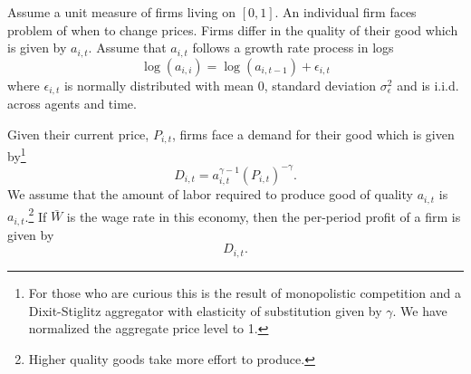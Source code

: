 \documentclass{exam}
\begin{document}
Assume a unit measure of firms living on $[0,1]$.  An individual firm faces problem of when to change prices.  Firms differ in the quality of their good which is given by $a_{i,t}$.  Assume that $a_{i,t}$ follows a growth rate process in logs
\begin{equation}
\log(a_{i,i})=\log(a_{i,t-1})+\epsilon_{i,t}
\end{equation} where $\epsilon_{i,t}$ is normally distributed with mean $0$, standard deviation $\sigma^2_\epsilon$ and is i.i.d. across agents and time.

Given their current price, $P_{i,t}$, firms face a demand for their good which is given by\footnote{For those who are curious this is the result of monopolistic competition and a Dixit-Stiglitz aggregator with elasticity of substitution given by $\gamma$.  We have normalized the aggregate price level to 1.}
\begin{equation}
D_{i,t}=a_{i,t}^{\gamma-1}\left(P_{i,t}\right)^{-\gamma}.
\end{equation}  We assume that the amount of labor required to produce good of quality $a_{i,t}$ is $a_{i,t}$.\footnote{Higher quality goods take more effort to produce.} If $\bar W$ is the wage rate in this economy, then the per-period profit of a firm is given by
\begin{equation*}
  	[P_{i,t}-a_{i,t}\bar W]D_{i,t}.
\end{equation*}
\end{document}
